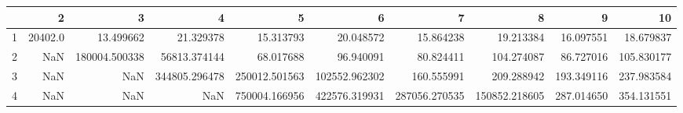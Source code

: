 \begin{tabular}{lrrrrrrrrr}
\toprule
{} &       2  &             3  &             4  &             5  &             6  &             7  &             8  &          9  &          10 \\
\midrule
1 &  20402.0 &      13.499662 &      21.329378 &      15.313793 &      20.048572 &      15.864238 &      19.213384 &   16.097551 &   18.679837 \\
2 &      NaN &  180004.500338 &   56813.374144 &      68.017688 &      96.940091 &      80.824411 &     104.274087 &   86.727016 &  105.830177 \\
3 &      NaN &            NaN &  344805.296478 &  250012.501563 &  102552.962302 &     160.555991 &     209.288942 &  193.349116 &  237.983584 \\
4 &      NaN &            NaN &            NaN &  750004.166956 &  422576.319931 &  287056.270535 &  150852.218605 &  287.014650 &  354.131551 \\
\bottomrule
\end{tabular}
